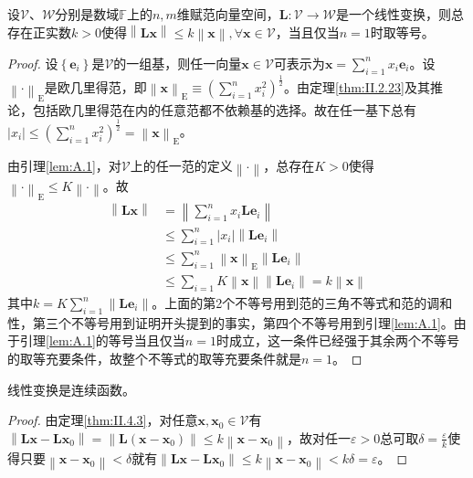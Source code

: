 \documentclass[main.tex]{subfiles}
\begin{document}
\begin{theorem}\label{thm:II.4.3}
    设$\mathcal{V}$、$\mathcal{W}$分别是数域$\mathbb{F}$上的$n,m$维赋范向量空间，$\mathbf{L}:\mathcal{V}\rightarrow\mathcal{W}$是一个线性变换，则总存在正实数$k>0$使得$\left\|\mathbf{Lx}\right\|\leq k\left\|\mathbf{x}\right\|,\forall\mathbf{x}\in\mathcal{V}$，当且仅当$n=1$时取等号。
\end{theorem}
\begin{proof}
    设$\left\{\mathbf{e}_i\right\}$是$\mathcal{V}$的一组基，则任一向量$\mathbf{x}\in\mathcal{V}$可表示为$\mathbf{x}=\sum_{i=1}^nx_i\mathbf{e}_i$。设$\left\|\cdot\right\|_\mathrm{E}$是欧几里得范，即$\left\|\mathbf{x}\right\|_\mathrm{E}\equiv\left(\sum_{i=1}^nx_i^2\right)^\frac{1}{2}$。由定理\ref{thm:II.2.23}及其推论，包括欧几里得范在内的任意范都不依赖基的选择。故在任一基下总有$\left|x_i\right|\leq\left(\sum_{i=1}^nx_i^2\right)^\frac{1}{2}=\left\|\mathbf{x}\right\|_\mathrm{E}$。

    由引理\ref{lem:A.1}，对$\mathcal{V}$上的任一范的定义$\left\|\cdot\right\|$，总存在$K>0$使得$\left\|\cdot\right\|_\mathrm{E}\leq K\left\|\cdot\right\|$。故
    \begin{align*}
        \left\|\mathbf{Lx}\right\| & =\left\|\sum_{i=1}^nx_i\mathbf{Le}_i\right\|                                                     \\
                                   & \leq\sum_{i=1}^n\left|x_i\right|\left\|\mathbf{Le}_i\right\|                                     \\
                                   & \leq\sum_{i=1}^n\left\|\mathbf{x}\right\|_\mathrm{E}\left\|\mathbf{Le}_i\right\|                 \\
                                   & \leq\sum_{i=1} K\left\|\mathbf{x}\right\|\left\|\mathbf{Le}_i\right\|=k\left\|\mathbf{x}\right\|
    \end{align*}
    其中$k=K\sum_{i=1}^n\left\|\mathbf{Le}_i\right\|$。上面的第2个不等号用到范的三角不等式和范的调和性，第三个不等号用到证明开头提到的事实，第四个不等号用到引理\ref{lem:A.1}。由于引理\ref{lem:A.1}的等号当且仅当$n=1$时成立，这一条件已经强于其余两个不等号的取等充要条件，故整个不等式的取等充要条件就是$n=1$。
\end{proof}

\begin{corollary}
    线性变换是连续函数。
\end{corollary}
\begin{proof}
    由定理\ref{thm:II.4.3}，对任意$\mathbf{x},\mathbf{x}_0\in\mathcal{V}$有$\left\|\mathbf{Lx}-\mathbf{Lx}_0\right\|=\left\|\mathbf{L}\left(\mathbf{x}-\mathbf{x}_0\right)\right\|\leq k\left\|\mathbf{x}-\mathbf{x}_0\right\|$，故对任一$\varepsilon>0$总可取$\delta=\frac{\varepsilon}{k}$使得只要$\left\|\mathbf{x}-\mathbf{x}_0\right\|<\delta$就有$\left\|\mathbf{Lx}-\mathbf{Lx}_0\right\|\leq k\left\|\mathbf{x}-\mathbf{x}_0\right\|<k\delta=\varepsilon$。
\end{proof}
\end{document}
